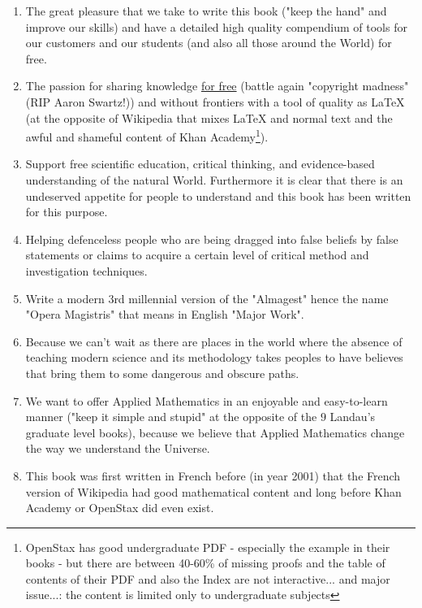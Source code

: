 	\begin{enumerate}
		\item The great pleasure that we take to write this book ("keep the hand" and improve our skills) and have a detailed high quality compendium of tools for our customers and our students (and also all those around the World) for free.

		\item The passion for sharing knowledge \underline{for free} (battle again "copyright madness" (RIP Aaron Swartz!)) and without frontiers with a tool of quality as \LaTeX{} (at the opposite of Wikipedia that mixes \LaTeX{} and normal text and the awful and shameful content of Khan Academy\footnote{OpenStax has good undergraduate PDF - especially the example in their books - but there are between 40-60\% of missing proofs and the table of contents of their PDF and also the Index are not interactive... and major issue...: the content is limited only to undergraduate subjects}).
		
		\item Support free scientific education, critical thinking, and evidence-based understanding of the natural World. Furthermore it is clear that there is an undeserved appetite for people to understand and this book has been written for this purpose.
		
		\item Helping defenceless people who are being dragged into false beliefs by false statements or claims to acquire a certain level of critical method and investigation techniques.
		
		\item Write a modern 3rd millennial version of the "Almagest" hence the name "Opera Magistris" that means in English "Major Work".
		
		\item Because we can't wait as there are places in the world where the absence of teaching modern science and its methodology takes peoples to have believes that bring them to some dangerous and obscure paths.
		
		\item We want to offer Applied Mathematics in an enjoyable and easy-to-learn manner ("keep it simple and stupid" at the opposite of the $9$ Landau's graduate level books), because we believe that Applied Mathematics change the way we understand the Universe.
		
		\item This book was first written in French before (in year 2001) that the French version of Wikipedia had good mathematical content and long before Khan Academy or OpenStax did even exist.


\end{enumerate}
